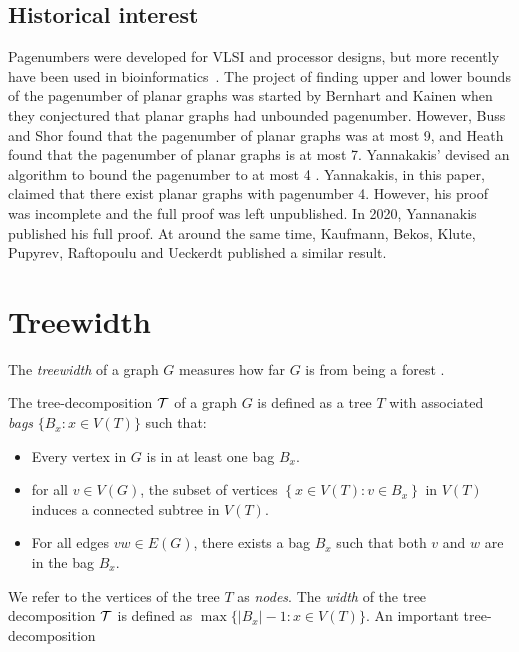 \subsection{Historical interest}\label{ssec:Pagenumber_History}
Pagenumbers were developed for VLSI and processor designs, but more recently have been used in bioinformatics~\cite{haslingerRNAStructuresPseudoknots1999}. 
The project of finding upper and lower bounds of the pagenumber of planar graphs was started by Bernhart and Kainen when they conjectured that planar graphs had unbounded pagenumber. However, Buss and Shor\cite{bussPagenumberPlanarGraphs1984} found that the pagenumber of planar graphs was at most 9, and Heath \cite{heathEmbeddingPlanarGraphs1984} found that the pagenumber of planar graphs is at most 7. Yannakakis' devised an algorithm to bound the pagenumber to at most 4 \cite{yannakakisEmbeddingPlanarGraphs1989}. Yannakakis, in this paper, claimed that there exist planar graphs with pagenumber 4. However, his proof was incomplete and the full proof was left unpublished. In 2020, Yannanakis published his full proof.\cite{yannakakisPlanarGraphsThat2020} At around the same time, Kaufmann, Bekos, Klute, Pupyrev, Raftopoulu and Ueckerdt published a similar result\cite{kaufmannFourPagesAre2020}. 

\section{Treewidth}\label{sec:treewidth}

The \textit{treewidth} of a graph \(G\) measures how far \(G\) is from being a forest \cite{diestelGraphMinors2017}. 

\begin{definition}\label{def:tree-decomposition}
	The tree-decomposition \(\mathcal{T}\) of a graph \(G\) is defined as a tree \(T\) with associated \textit{bags} \(\lbrace B_x : x \in V(T) \rbrace\) such that:
	\begin{itemize}
		\item Every vertex in \(G\) is in at least one bag \(B_x\). 
		\item for all \(v \in V(G)\), the subset of vertices \(\left\lbrace x \in V(T): v \in B_x \right\rbrace\) in \(V(T)\) induces a connected subtree in \(V(T)\).
		\item For all edges \(vw \in E(G)\), there exists a bag \(B_x\) such that both \(v\) and \(w\) are in the bag \(B_x\).
	\end{itemize}
\end{definition}
We refer to the vertices of the tree \(T\) as \textit{nodes}. 
The \textit{width} of the tree decomposition \(\mathcal{T}\) is defined as \(\max \lbrace |B_x| - 1 : x \in V(T) \rbrace\). An important tree-decomposition 

